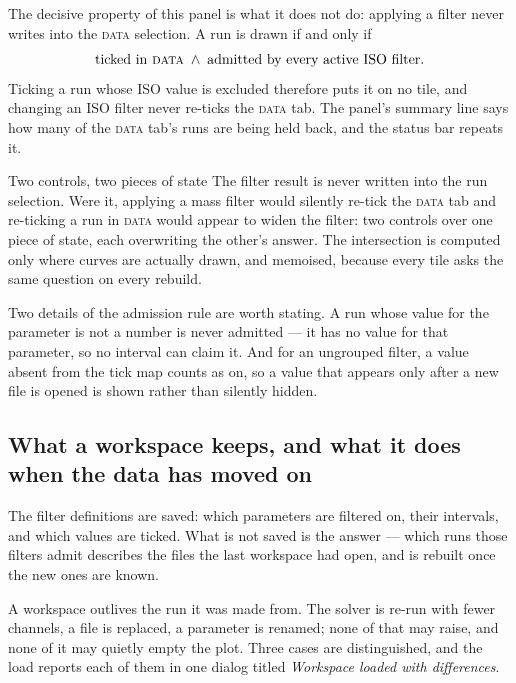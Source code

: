 \documentclass[11pt,a4paper,oneside]{report}
\newcommand{\tab}[1]{\textsc{#1}}
\begin{document}
The decisive property of this panel is what it does not do: applying a filter
never writes into the \tab{data} selection. A run is drawn if and only if
\[
  \text{ticked in \tab{data}} \;\wedge\; \text{admitted by every active ISO filter.}
\]
Ticking a run whose ISO value is excluded therefore puts it on no tile, and
changing an ISO filter never re-ticks the \tab{data} tab. The panel's summary
line says how many of the \tab{data} tab's runs are being held back, and the
status bar repeats it.

\begin{aoenote}{Two controls, two pieces of state}
The filter result is never written into the run selection. Were it, applying a
mass filter would silently re-tick the \tab{data} tab and re-ticking a run in
\tab{data} would appear to widen the filter: two controls over one piece of
state, each overwriting the other's answer. The intersection is computed only
where curves are actually drawn, and memoised, because every tile asks the same
question on every rebuild.
\end{aoenote}

Two details of the admission rule are worth stating. A run whose value for the
parameter is not a number is never admitted --- it has no value for that
parameter, so no interval can claim it. And for an ungrouped filter, a value
absent from the tick map counts as on, so a value that appears only after a new
file is opened is shown rather than silently hidden.

\subsection{What a workspace keeps, and what it does when the data has moved on}

The filter definitions are saved: which parameters are filtered on, their
intervals, and which values are ticked. What is not saved is the answer --- which
runs those filters admit describes the files the last workspace had open, and is
rebuilt once the new ones are known.

A workspace outlives the run it was made from. The solver is re-run with fewer
channels, a file is replaced, a parameter is renamed; none of that may raise, and
none of it may quietly empty the plot. Three cases are distinguished, and the
load reports each of them in one dialog titled \emph{Workspace loaded with
differences}.
\end{document}
